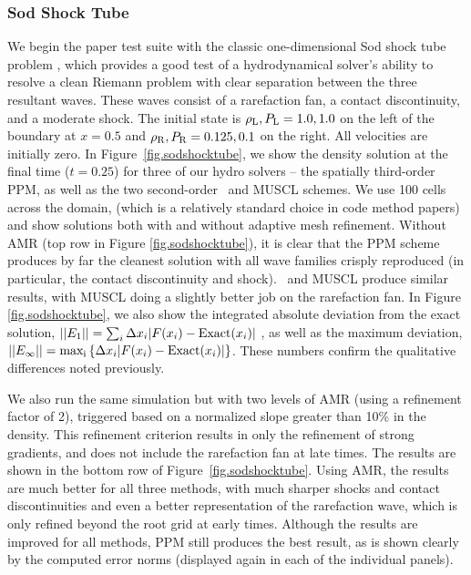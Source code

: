 \subsubsection{Sod Shock Tube}
\label{sec.tests.sodshock}

We begin the paper test suite with the classic one-dimensional Sod shock tube problem
\citep{Sod78}, which provides a good test of a hydrodynamical solver's
ability to resolve a clean Riemann problem with clear separation
between the three resultant waves.  These waves consist of a rarefaction fan, a
contact discontinuity, and a moderate shock.  The initial state is 
$\rho_{\rm L}, P_{\rm L} = 1.0, 1.0$ on the left of the boundary at 
$x=0.5$ and $\rho_{\rm R}, P_{\rm R} = 0.125, 0.1$ on the right.
All velocities are initially zero.  In
Figure~\ref{fig.sodshocktube}, we show the density solution at the
final time ($t=0.25$) for three of our hydro solvers -- the spatially third-order
PPM, as well as the two second-order \zeus\ and MUSCL schemes.  We use
100 cells across the domain, (which is a relatively standard choice in
code method papers) and show solutions both with and without adaptive
mesh refinement.  Without AMR (top row in Figure \ref{fig.sodshocktube}), it is
clear that the PPM scheme produces by far the cleanest solution with
all wave families crisply reproduced (in particular, the contact
discontinuity and shock).  \zeus\ and MUSCL produce similar results,
with MUSCL doing a slightly better job on the rarefaction fan.  In Figure
\ref{fig.sodshocktube}, we also show the integrated absolute deviation from 
the exact solution, $||E_1|| = \sum_i \Delta x_i |F(x_i)-{\rm Exact}(x_i)|$ 
, as well as the maximum deviation,
$||E_\infty|| = \mathrm{max_i}\left\{ \Delta x_i|F(x_i)-{\rm Exact}(x_i)| \right\}$.  
These numbers confirm the qualitative differences noted
previously.

We also run the same simulation but with two levels of AMR (using a
refinement factor of 2), triggered based on a normalized slope greater
than 10\% in the density.  This refinement criterion results in only
the refinement of strong gradients, and
does not include the rarefaction fan at late times.  The results are
shown in the bottom row of Figure~\ref{fig.sodshocktube}.  Using AMR,
the results are much better for all three methods, with much sharper
shocks and contact discontinuities and even a better representation of
the rarefaction wave, which is only refined beyond the root grid at
early times.  Although the results are improved for all methods, PPM
still produces the best result, as is shown clearly by the computed
error norms (displayed again in each of the individual panels).

